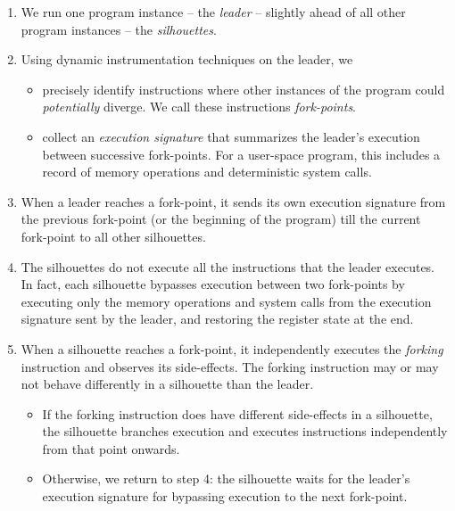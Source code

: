 \begin{enumerate}

\item We run one program instance -- the {\em leader} -- 
slightly ahead of all other program instances -- the {\em silhouettes}.

\item Using dynamic instrumentation techniques on the leader, we
\begin{itemize}
\item precisely identify instructions where other instances of the
program could {\em potentially} diverge. We call these instructions {\em fork-points}.
\item collect an {\em execution signature} that summarizes the 
leader's execution between successive fork-points. For a user-space program, 
this includes a record of memory operations and 
deterministic system calls.
\end{itemize}

\item When a leader reaches a fork-point, it sends its
own execution signature from the previous fork-point (or the
beginning of the program) till the current fork-point to all
other silhouettes. 


\item The silhouettes do not execute
all the instructions that the leader executes.
In fact, each silhouette bypasses execution between
two fork-points by executing only the memory
operations and system calls from the 
execution signature sent by the leader,
and restoring the register state at the end.

\item 
When a silhouette reaches a fork-point, it 
independently executes the {\em forking} instruction
and observes its side-effects.
The forking instruction may or 
may not behave differently
in a silhouette than the leader.

\begin{itemize}
\item If the forking instruction
does have different side-effects
in a silhouette, the silhouette branches execution and 
executes instructions independently
from that point onwards. 

\item Otherwise, we return to step 4: the
silhouette waits for the 
leader's
execution signature for bypassing
execution to the next fork-point.

\end{itemize}
\end{enumerate}

